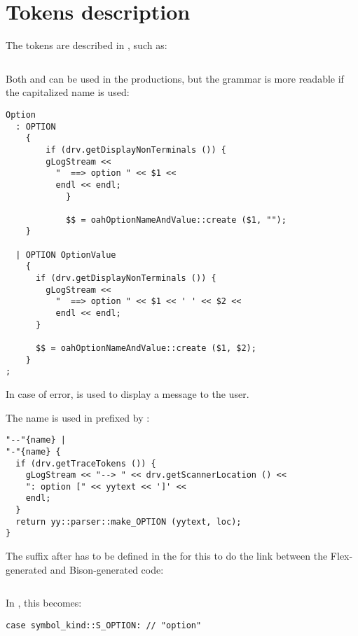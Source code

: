 \section{Tokens description}\label{Tokens description}

The tokens are described in , such as:
\begin{lstlisting}[language=Bison]
%token <string> OPTION "option"
\end{lstlisting}

Both  and  can be used in the productions, but the grammar is more readable if the capitalized name is used:
\begin{lstlisting}[language=Bison]
Option
  : OPTION
    {
	    if (drv.getDisplayNonTerminals ()) {
        gLogStream <<
          "  ==> option " << $1 <<
          endl << endl;
			}

			$$ = oahOptionNameAndValue::create ($1, "");
    }

  | OPTION OptionValue
    {
      if (drv.getDisplayNonTerminals ()) {
        gLogStream <<
          "  ==> option " << $1 << ' ' << $2 <<
          endl << endl;
      }

      $$ = oahOptionNameAndValue::create ($1, $2);
    }
;
\end{lstlisting}

In case of error,  is used to display a message to the user.

The name  is used in  prefixed by :
\begin{lstlisting}[language=Flex]
"--"{name} |
"-"{name} {
  if (drv.getTraceTokens ()) {
    gLogStream << "--> " << drv.getScannerLocation () <<
    ": option [" << yytext << ']' <<
    endl;
  }
  return yy::parser::make_OPTION (yytext, loc);
}
\end{lstlisting}

The suffix after  has to be defined in the  for this to do the link between the Flex-generated and Bison-generated code:
\begin{lstlisting}[language=Terminal]
%token <string> OPTION "option"
\end{lstlisting}

In , this becomes:
\begin{lstlisting}[language=CPlusPlus]
      case symbol_kind::S_OPTION: // "option"
\end{lstlisting}

